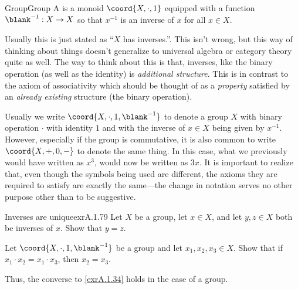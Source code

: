 \begin{dfn}{Group}{Group}
A  is a monoid $\coord{X,\cdot ,1}$ equipped with a function $\blank ^{-1}:X\rightarrow X$ so that $x^{-1}$ is an inverse of $x$ for all $x\in X$.
\begin{rmk}
Usually this is just stated as ``$X$ has inverses.''.  This isn't wrong, but this way of thinking about things doesn't generalize to universal algebra or category theory quite as well.  The way to think about this is that, inverses, like the binary operation (as well as the identity) is \emph{additional structure}.  This is in contrast to the axiom of associativity which should be thought of as a \emph{property} satisfied by an \emph{already existing} structure (the binary operation).
\end{rmk}
\begin{rmk}
Usually we write $\coord{X,\cdot ,1,\blank ^{-1}}$ to denote a group $X$ with binary operation $\cdot$ with identity $1$ and with the inverse of $x\in X$ being given by $x^{-1}$.  However, especially if the group is commutative, it is also common to write $\coord{X,+,0,-}$ to denote the same thing.  In this case, what we previously would have written as $x^3$, would now be written as $3x$.  It is important to realize that, even though the symbols being used are different, the axioms they are required to satisfy are exactly the same---the change in notation serves no other purpose other than to be suggestive.
\end{rmk}
\end{dfn}
\begin{exr}{Inverses are unique}{exrA.1.79}
Let $X$ be a group, let $x\in X$, and let $y,z\in X$ both be inverses of $x$.  Show that $y=z$.
\end{exr}
\begin{exr}{}{}
Let $\coord{X,\cdot,1,\blank ^{-1}}$ be a group and let $x_1,x_2,x_3\in X$.  Show that if $x_1\cdot x_2=x_1\cdot x_3$, then $x_2=x_3$.
\begin{rmk}
Thus, the converse to \cref{exrA.1.34} holds in the case of a group.
\end{rmk}
\end{exr}
